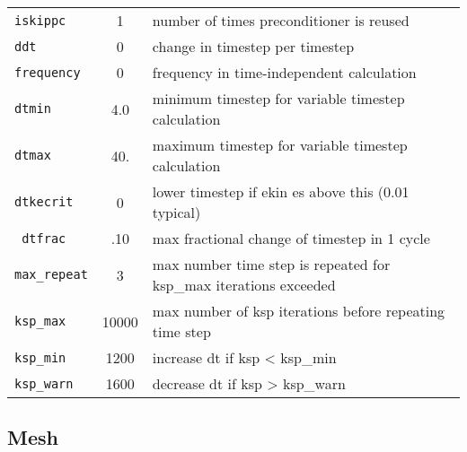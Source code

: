 \begin{tabular}{lcp{4in}}
  \texttt{iskippc} & 1 & number of times preconditioner is reused \\
  \texttt{ddt}     & 0 & change in timestep per timestep \\
  \texttt{frequency} & 0 & frequency in time-independent calculation \\
  \texttt{dtmin}     & 4.0 & minimum timestep for variable timestep calculation \\
  \texttt{dtmax}     & 40. & maximum timestep for variable timestep calculation \\
  \texttt{dtkecrit}  & 0 &  lower timestep if ekin es above this (0.01 typical) \\
  \texttt{ dtfrac}   & .10 & max fractional change of timestep in 1 cycle \\
  \texttt{max\_repeat}  & 3 & max number time step is repeated for ksp\_max iterations exceeded \\
  \texttt{ksp\_max}     & 10000 & max number of ksp iterations before repeating time step \\
  \texttt{ksp\_min}     & 1200  & increase dt if ksp < ksp\_min  \\
  \texttt{ksp\_warn}    & 1600  & decrease dt if ksp > ksp\_warn \\
\end{tabular}

\subsection{Mesh}

